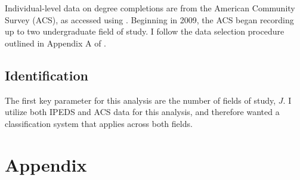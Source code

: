 \documentclass[11 pt]{article}
\begin{document}
Individual-level data on degree completions are from the American Community Survey (ACS), as accessed using \textcite{IPUMS}.
Beginning in 2009, the ACS began recording up to two undergraduate field of study. 
I follow the data selection procedure outlined in Appendix A of \textcite{SHB19}.


\subsection{Identification}

The first key parameter for this analysis are the number of fields of study, $J$. 
I utilize both IPEDS and ACS data for this analysis, and therefore wanted a classification system that applies across both fields. 

% 

\section*{Appendix}
\setcounter{table}{0}
\renewcommand{\thetable}{A\arabic{table}}




\printbibliography
\end{document}
